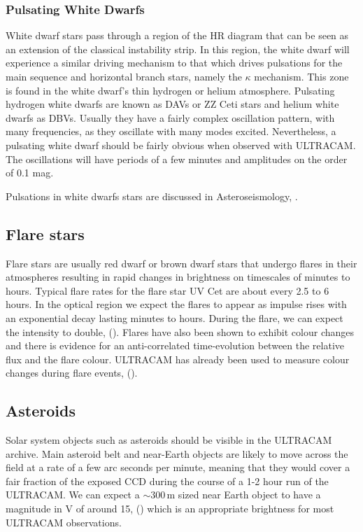 \subsubsection{Pulsating White Dwarfs}
White dwarf stars pass through a region of the HR diagram that can be seen as an extension of the classical instability strip. In this region, the white dwarf will experience a similar driving mechanism to that which drives pulsations for the main sequence and horizontal branch stars, namely the $\kappa$ mechanism. This zone is found in the white dwarf's thin hydrogen or helium atmosphere. Pulsating hydrogen white dwarfs are known as {DAVs} or {ZZ Ceti} stars and helium white dwarfs as {DBV}s. Usually they have a fairly complex oscillation pattern, with many frequencies, as they oscillate with many modes excited. Nevertheless, a pulsating white dwarf should be fairly obvious when observed with ULTRACAM. The oscillations will have periods of a few minutes and amplitudes on the order of 0.1 mag. 

Pulsations in white dwarfs stars are discussed in Asteroseismology, \cite{KurtzBook}.

\subsection{Flare stars}
Flare stars are usually red dwarf or brown dwarf stars that undergo flares in their atmospheres resulting in rapid changes in brightness on timescales of minutes to hours. Typical flare rates for the flare star {UV Cet} are about every 2.5 to 6 hours. In the optical region we expect the flares to appear as impulse rises with an exponential decay lasting minutes to hours. During the flare, we can expect the intensity to double, (\cite{stellaractivity}). Flares have also been shown to exhibit colour changes and there is evidence for an anti-correlated time-evolution between the relative flux and the flare colour. ULTRACAM has already been used to measure colour changes during flare events, (\cite{ULTRACAMFlare}).  

\subsection{Asteroids}
Solar system objects such as asteroids should be visible in the ULTRACAM archive. Main asteroid belt and near-Earth objects are likely to move across the field at a rate of a few arc seconds per minute, meaning that they would cover a fair fraction of the exposed CCD during the course of a 1-2 hour run of the ULTRACAM. We can expect a $\sim 300\,\mbox{m}$ sized near Earth object to have a magnitude in V of around 15, (\cite{neosmalltelescope}) which is an appropriate brightness for most ULTRACAM observations. 

